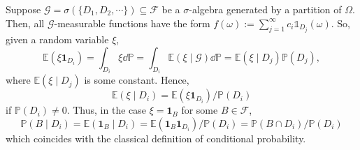 \documentclass[]{article}
\theoremstyle{definition}
\theoremstyle{definition}
\begin{document}
Suppose \(\mathcal{G} = \sigma(\{D_1, D_2, \cdots\}) \subseteq \mathcal{F}\) be a  
\(\sigma\)-algebra generated by a partition of \(\Omega\). Then, all 
\(\mathcal{G}\)-measurable functions have the form \(f(\omega) :=
\sum_{j= 1}^\infty c_i \mathbb{1}_{D_j}(\omega)\). So, given a random variable 
\(\xi\),
\[\mathbb{E}(\xi \mathbf{1}_{D_i}) = \int_{D_i} \xi \dd \mathbb{P} = 
\int_{D_i} \mathbb{E}(\xi \mid \mathcal{G}) \dd \mathbb{P} 
= \mathbb{E}(\xi \mid D_j) \mathbb{P}(D_j),\]
where \(\mathbb{E}(\xi \mid D_j)\) is some constant. Hence, 
\[\mathbb{E}(\xi \mid D_i) = \mathbb{E}(\xi \mathbf{1}_{D_i}) / \mathbb{P}(D_i)\]
if \(\mathbb{P}(D_i) \neq 0\). Thus, in the case \(\xi = \mathbf{1}_B\) for 
some \(B \in \mathcal{F}\), 
\[\mathbb{P}(B \mid D_i) = 
\mathbb{E}(\mathbf{1}_B \mid D_i) = 
  \mathbb{E}(\mathbf{1}_B \mathbf{1}_{D_i}) / \mathbb{P}(D_i) = 
  \mathbb{P}(B \cap D_i) / \mathbb{P}(D_i)\]
which coincides with the classical definition of conditional probability.
\end{document}

